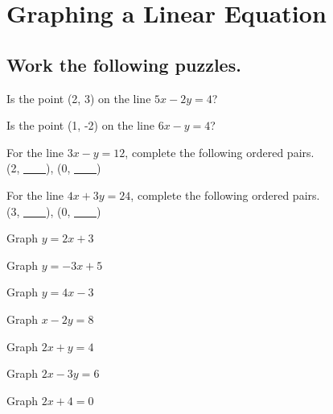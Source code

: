 \section{Graphing a Linear Equation}

\subsection*{Work the following puzzles.}

\begin{puzzle}
    Is the point (2, 3) on the line \(5x - 2y = 4\)?
\end{puzzle}

\begin{puzzle}
    Is the point (1, -2) on the line \(6x - y = 4\)?
\end{puzzle}

\begin{puzzle}
    For the line \(3x - y = 12\), complete the following ordered pairs.\\
    (2, \underline{~~~~}), (0, \underline{~~~~})
\end{puzzle}

\begin{puzzle}
    For the line \(4x + 3y = 24\), complete the following ordered pairs.\\
    (3, \underline{~~~~}), (0, \underline{~~~~})
\end{puzzle}

\begin{puzzle}
    Graph \(y = 2x + 3\)
\end{puzzle}

\begin{puzzle}
    Graph \(y = -3x + 5\)
\end{puzzle}

\begin{puzzle}
    Graph \(y = 4x - 3\)
\end{puzzle}

\begin{puzzle}
    Graph \(x - 2y = 8\)
\end{puzzle}

\begin{puzzle}
    Graph \(2x + y = 4\)
\end{puzzle}

\begin{puzzle}
    Graph \(2x - 3y = 6\)
\end{puzzle}

\begin{puzzle}
    Graph \(2x + 4 = 0\)
\end{puzzle}

